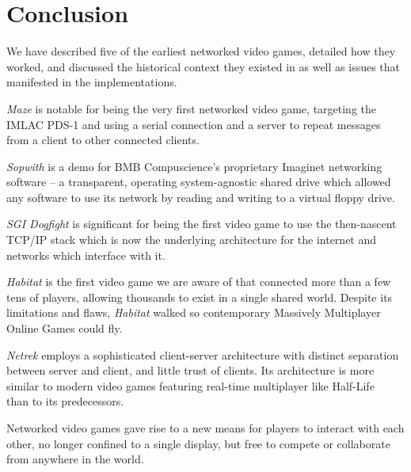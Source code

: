 \section{Conclusion}\label{sec:conclusion}

We have described five of the earliest networked video games, detailed how they worked, and discussed the historical context they existed in as well as issues that manifested in the implementations.

\textit{Maze} is notable for being the very first networked video game, targeting the IMLAC PDS-1 and using a serial connection and a server to repeat messages from a client to other connected clients.

\textit{Sopwith} is a demo for BMB Compuscience's proprietary Imaginet networking software -- a transparent, operating system-agnostic shared drive which allowed any software to use its network by reading and writing to a virtual floppy drive.

\textit{SGI Dogfight} is significant for being the first video game to use the then-nascent TCP/IP stack which is now the underlying architecture for the internet and networks which interface with it.

\textit{Habitat} is the first video game we are aware of that connected more than a few tens of players, allowing thousands to exist in a single shared world. Despite its limitations and flaws, \textit{Habitat} walked so contemporary Massively Multiplayer Online Games could fly.

\textit{Netrek} employs a sophisticated client-server architecture with distinct separation between server and client, and little trust of clients. Its architecture is more similar to modern video games featuring real-time multiplayer like Half-Life~\cite{YahnW.Bernier2003LatencyOptimization} than to its predecessors.

Networked video games gave rise to a new means for players to interact with each other, no longer confined to a single display, but free to compete or collaborate from anywhere in the world.
